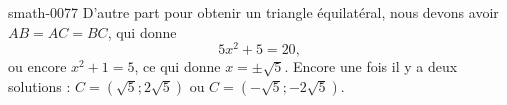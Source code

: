 \begin{corrige}{smath-0077}
D'autre part pour obtenir un triangle équilatéral, nous devons avoir \( AB=AC=BC\), qui donne
\begin{equation}
    5x^2+5=20,
\end{equation}
ou encore \( x^2+1=5\), ce qui donne \( x=\pm\sqrt{5}\). Encore une fois il y a deux solutions : \( C=(\sqrt{5};2\sqrt{5})\) ou \( C=(-\sqrt{5};-2\sqrt{5})\).

\end{corrige}
